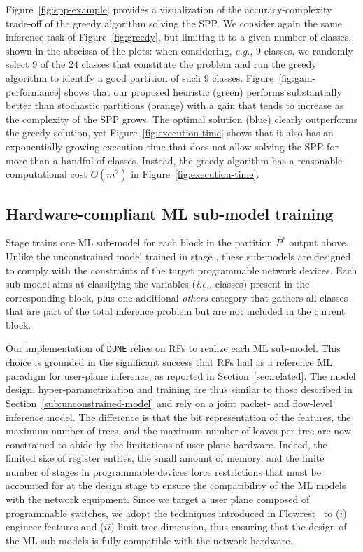 \documentclass[journal]{IEEEtran}
\theoremstyle{plain} %
\newcommand{\eg}{\textit{e.g.},\xspace}
\newcommand{\ie}{\textit{i.e.},\xspace}
\newcommand*\numO[1]{\raisebox{.5pt}{\textcircled{\raisebox{-.9pt} {#1}}}}
\newcommand{\name}{\texttt{\fontsize{9}{11}\selectfont DUNE}\xspace}
\begin{document}
Figure~\ref{fig:spp-example} provides a visualization of the accuracy-complexity trade-off of the greedy algorithm solving the SPP. We consider again the same inference task of Figure~\ref{fig:greedy}, but limiting it to a given number of classes, shown in the abscissa of the plots: when considering, \eg 9 classes, we randomly select 9 of the 24 classes that constitute the problem and run the greedy algorithm to identify a good partition of such 9 classes.
Figure~\ref{fig:gain-performance} shows that our proposed heuristic (green) performs substantially better than stochastic partitions (orange) with a gain that tends to increase as the complexity of the SPP grows.
The optimal solution (blue) clearly outperforms the greedy solution, yet Figure~\ref{fig:execution-time} shows that it also has an exponentially growing execution time that does not allow solving the SPP for more than a handful of classes. Instead, the greedy algorithm has a reasonable computational cost $O(m^2)$ in Figure~\ref{fig:execution-time}.

\subsection{Hardware-compliant ML sub-model training}
\label{sub:sub-models}

Stage \numO{4} trains one ML sub-model for each block in the partition $P^*$ output above. Unlike the unconstrained model trained in stage \numO{1}, these sub-models are designed to comply with the constraints of the target programmable network devices. Each sub-model aims at classifying the variables (\ie classes) present in the corresponding block, plus one additional \textit{others} category that gathers all classes that are part of the total inference problem but are not included in the current block.

Our implementation of \name relies on RFs to realize each ML sub-model. This choice is grounded in the significant success that RFs had as a reference ML paradigm for user-plane inference, as reported in Section~\ref{sec:related}.
The model design, hyper-parametrization and training are thus similar to those described in Section~\ref{sub:unconstrained-model} and rely on a joint packet- and flow-level inference model. The difference is that the bit representation of the features, the maximum number of trees, and the maximum number of leaves per tree are now constrained to abide by the limitations of user-plane hardware. Indeed, the limited size of register entries, the small amount of memory, and the finite number of stages in programmable devices force restrictions that must be accounted for at the design stage to ensure the compatibility of the ML models with the network equipment. Since we target a user plane composed of programmable switches, we adopt the techniques introduced in Flowrest~\cite{flowrest} to ($i$) engineer features and ($ii$) limit tree dimension, thus ensuring that the design of the ML sub-models is fully compatible with the network hardware.
\end{document}
